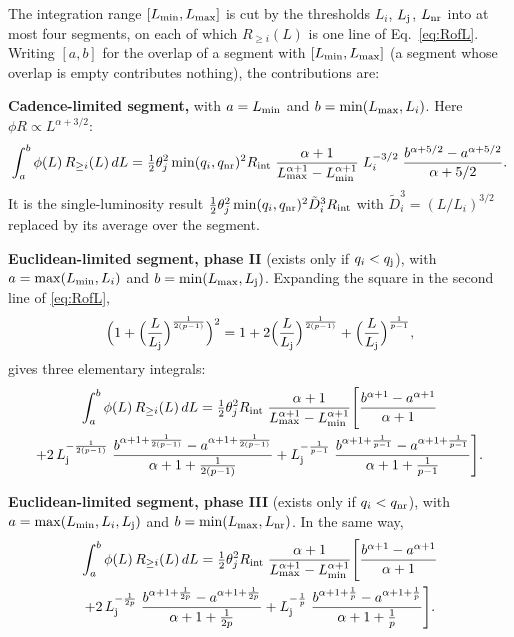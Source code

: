 \documentclass[11pt,a4paper]{article}
\newcommand{\tD}{\tilde{D}}
\newcommand{\nr}{{\rm nr}}
\newcommand{\Rint}{R_{\rm int}}
\newcommand{\Lmin}{L_{\rm min}}
\newcommand{\Lmax}{L_{\rm max}}
\newcommand{\Lj}{L_{\rm j}}
\newcommand{\Lnr}{L_{\rm nr}}
\begin{document}
The integration range $[\Lmin,\Lmax]$ is cut by the thresholds $L_i$, $\Lj$, $\Lnr$ into at most four segments, on each of which $R_{\geq i}(L)$ is one line of Eq.~\eqref{eq:RofL}. Writing $[a,b]$ for the overlap of a segment with $[\Lmin,\Lmax]$ (a segment whose overlap is empty contributes nothing), the contributions are:

\medskip\noindent\textbf{Cadence-limited segment,} with $a=\Lmin$ and $b=\min(\Lmax,L_i)$. Here $\phi R\propto L^{\alpha+3/2}$:
\begin{equation}
\label{eq:seg1}
\int_a^b\phi(L)\,R_{\geq i}(L)\,dL=\tfrac12\theta_j^2\min(q_i,q_\nr)^2\Rint\;\frac{\alpha+1}{\Lmax^{\alpha+1}-\Lmin^{\alpha+1}}\;L_i^{-3/2}\;\frac{b^{\alpha+5/2}-a^{\alpha+5/2}}{\alpha+5/2}.
\end{equation}
It is the single-luminosity result $\tfrac12\theta_j^2\min(q_i,q_\nr)^2\tD_i^3\Rint$ with $\tD_i^3=(L/L_i)^{3/2}$ replaced by its average over the segment.

\medskip\noindent\textbf{Euclidean-limited segment, phase II} (exists only if $q_i<q_{\rm j}$), with $a=\max(\Lmin,L_i)$ and $b=\min(\Lmax,\Lj)$. Expanding the square in the second line of \eqref{eq:RofL},
\begin{equation}
\Bigl(1+\Bigl(\frac{L}{\Lj}\Bigr)^{\frac{1}{2(p-1)}}\Bigr)^2=1+2\Bigl(\frac{L}{\Lj}\Bigr)^{\frac{1}{2(p-1)}}+\Bigl(\frac{L}{\Lj}\Bigr)^{\frac{1}{p-1}},
\end{equation}
gives three elementary integrals:
\begin{multline}
\label{eq:seg2}
\int_a^b\phi(L)\,R_{\geq i}(L)\,dL=\tfrac12\theta_j^2\Rint\;\frac{\alpha+1}{\Lmax^{\alpha+1}-\Lmin^{\alpha+1}}\Biggl[\frac{b^{\alpha+1}-a^{\alpha+1}}{\alpha+1}\\
+2\,\Lj^{-\frac{1}{2(p-1)}}\;\frac{b^{\alpha+1+\frac{1}{2(p-1)}}-a^{\alpha+1+\frac{1}{2(p-1)}}}{\alpha+1+\frac{1}{2(p-1)}}
+\Lj^{-\frac{1}{p-1}}\;\frac{b^{\alpha+1+\frac{1}{p-1}}-a^{\alpha+1+\frac{1}{p-1}}}{\alpha+1+\frac{1}{p-1}}\Biggr].
\end{multline}

\medskip\noindent\textbf{Euclidean-limited segment, phase III} (exists only if $q_i<q_\nr$), with $a=\max(\Lmin,L_i,\Lj)$ and $b=\min(\Lmax,\Lnr)$. In the same way,
\begin{multline}
\label{eq:seg3}
\int_a^b\phi(L)\,R_{\geq i}(L)\,dL=\tfrac12\theta_j^2\Rint\;\frac{\alpha+1}{\Lmax^{\alpha+1}-\Lmin^{\alpha+1}}\Biggl[\frac{b^{\alpha+1}-a^{\alpha+1}}{\alpha+1}\\
+2\,\Lj^{-\frac{1}{2p}}\;\frac{b^{\alpha+1+\frac{1}{2p}}-a^{\alpha+1+\frac{1}{2p}}}{\alpha+1+\frac{1}{2p}}
+\Lj^{-\frac{1}{p}}\;\frac{b^{\alpha+1+\frac{1}{p}}-a^{\alpha+1+\frac{1}{p}}}{\alpha+1+\frac{1}{p}}\Biggr].
\end{multline}
\end{document}
